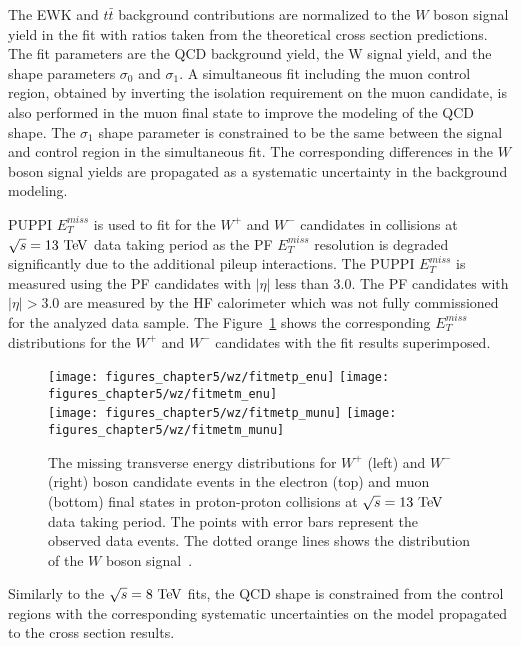 The EWK and $t\bar{t}$ background contributions are normalized to the $W$ boson signal yield in the fit with ratios taken from the theoretical cross section predictions. The fit parameters are the QCD background yield, the W signal yield, and the shape parameters $\sigma_0$ and $\sigma_1$. A simultaneous fit including the muon control region, obtained by inverting the isolation requirement on the muon candidate, is also performed in the muon final state to improve the modeling of the QCD shape. The $\sigma_1$ shape parameter is constrained to be the same between the signal and control region in the simultaneous fit. The corresponding differences in the $W$ boson signal yields are propagated as a systematic uncertainty in the background modeling.    
 
PUPPI $E_{T}^{miss}$ is used to fit for the $W^{+}$ and $W^{-}$ candidates in collisions at $\sqrt{s}=13~\mathrm{Te\kern -0.1em V}$ data taking period as the PF $E_{T}^{miss}$ resolution is degraded significantly due to the additional pileup interactions. The PUPPI $E_{T}^{miss}$ is measured using the PF candidates with $|\eta|$ less than $3.0$. The PF candidates with $|\eta|>3.0$ are measured by the HF calorimeter which was not fully commissioned for the analyzed data sample. The Figure~\ref{fig:W13} shows the corresponding $E_{T}^{miss}$ distributions for the $W^{+}$ and $W^{-}$ candidates with the fit results superimposed.
\begin{figure}[htbp]
\centering
\texttt{[image: figures\_chapter5/wz/fitmetp\_enu]}
\texttt{[image: figures\_chapter5/wz/fitmetm\_enu]}\\
\texttt{[image: figures\_chapter5/wz/fitmetp\_munu]}
\texttt{[image: figures\_chapter5/wz/fitmetm\_munu]}
\caption{The missing transverse energy distributions for $W^+$  (left) and $W^-$  (right) boson candidate events in the electron (top) and muon (bottom) final states in proton-proton collisions at $\sqrt{s}=13~\mathrm{Te\kern -0.1em V}$ data taking period. The points with error bars represent the observed data events. The dotted orange lines shows the distribution of the $W$ boson signal~\cite{CMS-PAS-SMP-15-004}. 
\label{fig:W13}}
\end{figure}
Similarly to the $\sqrt{s}=8~\mathrm{Te\kern -0.1em V}$ fits, the QCD shape is constrained from the control regions with the corresponding systematic uncertainties on the model propagated to the cross section results. 


